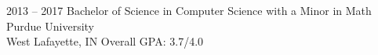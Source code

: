 \documentclass[9pt]{developercv} %
\begin{document}

\begin{entrylist}
	\entry
		{2013 -- 2017}
		{Bachelor of Science in Computer Science with a Minor in Math}
		{Purdue University \\\footnotesize{West Lafayette, IN}}
		{Overall GPA: 3.7/4.0}
\end{entrylist}



\end{document}
